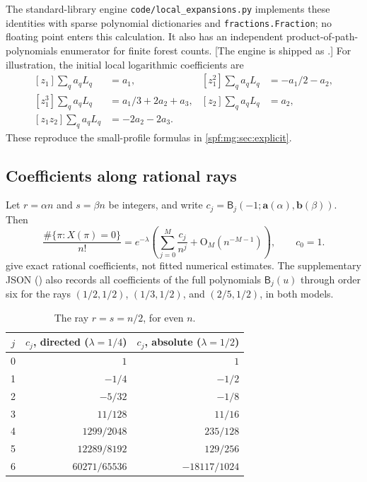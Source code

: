\documentclass[11pt]{article}
\numberwithin{equation}{section}
\theoremstyle{definition}
\theoremstyle{remark}
\theoremstyle{definition}
\newcommand{\bigO}{\mathrm O}
\newcommand{\mga}{\boldsymbol a}
\newcommand{\mgb}{\boldsymbol b}
\begin{document}
The standard-library engine \texttt{code/local\_expansions.py} implements
these identities with sparse polynomial dictionaries and
\texttt{fractions.Fraction}; no floating point enters this calculation.
It also has an independent product-of-path-polynomials enumerator for
finite forest counts. [The engine is shipped as
.] For illustration, the
initial local logarithmic
coefficients are
\begin{equation}
 \begin{aligned}
 [z_1]\sum_q a_qL_q&=a_1,&
 [z_1^2]\sum_q a_qL_q&=-a_1/2-a_2,\\
 [z_1^3]\sum_q a_qL_q&=a_1/3+2a_2+a_3,&
 [z_2]\sum_q a_qL_q&=a_2,\\
 [z_1z_2]\sum_q a_qL_q&=-2a_2-2a_3.
 \end{aligned}
 \label{spf:mg:eq:log-examples}
\end{equation}
These reproduce the small-profile formulas in \cref{spf:mg:sec:explicit}.

\subsection{Coefficients along rational rays}

Let $r=\alpha n$ and $s=\beta n$ be integers, and write
$c_j=\mathsf B_j(-1;\mga(\alpha),\mgb(\beta))$. Then
\begin{equation}
 \frac{\#\{\pi:X(\pi)=0\}}{n!}
 =e^{-\lambda}\left(\sum_{j=0}^{M}\frac{c_j}{n^j}
                       +\bigO_M(n^{-M-1})\right),
 \qquad c_0=1.
 \label{spf:mg:eq:ray-expansion}
\end{equation}
 give exact rational coefficients,
not fitted numerical estimates. The supplementary JSON
() also records
all coefficients of the full polynomials $\mathsf B_j(u)$ through order six
for the rays $(1/2,1/2)$, $(1/3,1/2)$, and $(2/5,1/2)$, in both models.

\begin{table}[htbp]
\centering
\renewcommand{\arraystretch}{1.25}
\begin{tabular}{@{}crr@{}}
\toprule
$j$ & $c_j$, directed ($\lambda=1/4$) & $c_j$, absolute ($\lambda=1/2$)\\
\midrule
0 & $1$ & $1$\\
1 & $-1/4$ & $-1/2$\\
2 & $-5/32$ & $-1/8$\\
3 & $11/128$ & $11/16$\\
4 & $1299/2048$ & $235/128$\\
5 & $12289/8192$ & $129/256$\\
6 & $60271/65536$ & $-18117/1024$\\
\bottomrule
\end{tabular}
\caption{The ray $r=s=n/2$, for even $n$.}
\label{spf:mg:tab:coeff-half}
\end{table}
\end{document}
